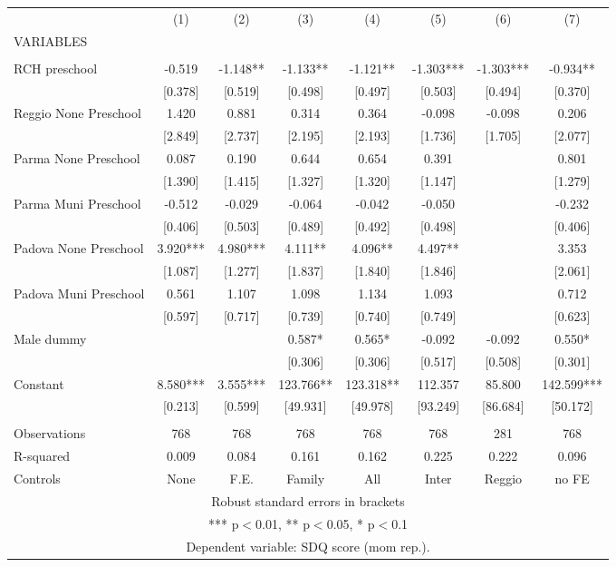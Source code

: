 \begin{tabular}{lccccccc} \hline
 & (1) & (2) & (3) & (4) & (5) & (6) & (7) \\
VARIABLES &  &  &  &  &  &  &  \\ \hline
 &  &  &  &  &  &  &  \\
RCH preschool & -0.519 & -1.148** & -1.133** & -1.121** & -1.303*** & -1.303*** & -0.934** \\
 & [0.378] & [0.519] & [0.498] & [0.497] & [0.503] & [0.494] & [0.370] \\
Reggio None Preschool & 1.420 & 0.881 & 0.314 & 0.364 & -0.098 & -0.098 & 0.206 \\
 & [2.849] & [2.737] & [2.195] & [2.193] & [1.736] & [1.705] & [2.077] \\
Parma None Preschool & 0.087 & 0.190 & 0.644 & 0.654 & 0.391 &  & 0.801 \\
 & [1.390] & [1.415] & [1.327] & [1.320] & [1.147] &  & [1.279] \\
Parma Muni Preschool & -0.512 & -0.029 & -0.064 & -0.042 & -0.050 &  & -0.232 \\
 & [0.406] & [0.503] & [0.489] & [0.492] & [0.498] &  & [0.406] \\
Padova None Preschool & 3.920*** & 4.980*** & 4.111** & 4.096** & 4.497** &  & 3.353 \\
 & [1.087] & [1.277] & [1.837] & [1.840] & [1.846] &  & [2.061] \\
Padova Muni Preschool & 0.561 & 1.107 & 1.098 & 1.134 & 1.093 &  & 0.712 \\
 & [0.597] & [0.717] & [0.739] & [0.740] & [0.749] &  & [0.623] \\
Male dummy &  &  & 0.587* & 0.565* & -0.092 & -0.092 & 0.550* \\
 &  &  & [0.306] & [0.306] & [0.517] & [0.508] & [0.301] \\
Constant & 8.580*** & 3.555*** & 123.766** & 123.318** & 112.357 & 85.800 & 142.599*** \\
 & [0.213] & [0.599] & [49.931] & [49.978] & [93.249] & [86.684] & [50.172] \\
 &  &  &  &  &  &  &  \\
Observations & 768 & 768 & 768 & 768 & 768 & 281 & 768 \\
R-squared & 0.009 & 0.084 & 0.161 & 0.162 & 0.225 & 0.222 & 0.096 \\
 Controls & None & F.E. & Family & All & Inter & Reggio & no FE \\ \hline
\multicolumn{8}{c}{ Robust standard errors in brackets} \\
\multicolumn{8}{c}{ *** p$<$0.01, ** p$<$0.05, * p$<$0.1} \\
\multicolumn{8}{c}{ Dependent variable: SDQ score (mom rep.).} \\
\end{tabular}
